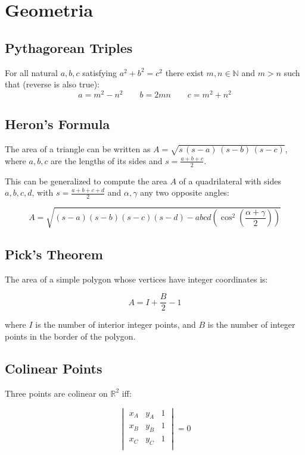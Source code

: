 \section{Geometria}
    
\subsection{Pythagorean Triples}

For all natural $a, b, c$ satisfying $a^2 + b^2 = c^2$ there exist $m, n \in \mathbb{N}$ and $m > n$ such that (reverse is also true):
$$a = m^2 - n^2 \qquad b = 2mn \qquad c = m^2 + n^2$$

\subsection{Heron's Formula}

The area of a triangle can be written as $A = \sqrt{s\,(s-a)\,(s-b)\,(s-c)}$, where $a, b, c$ are the lengths of its sides and $s = \frac{a+b+c}{2}$.

This can be generalized to compute the area $A$ of a quadrilateral with sides $a, b, c, d$, with $s = \frac{a+b+c+d}{2}$ and $\alpha, \gamma$ any two opposite angles:

$$ A = \sqrt{(s-a)(s-b)(s-c)(s-d) - abcd\left( \cos ^2 \left( \frac{\alpha+\gamma}{2} \right) \right)} $$

\subsection{Pick's Theorem}

The area of a simple polygon whose vertices have integer coordinates is:

\[
A = I + \frac{B}{2} - 1
\]

where $I$ is the number of interior integer points, and $B$ is the number of integer points in the border of the polygon.

\subsection{Colinear Points}

Three points are colinear on $\mathbb{R}^2$ iff:

$$ \begin{vmatrix}
x_A & y_A & 1 \\
x_B & y_B & 1 \\
x_C & y_C & 1 \\
\end{vmatrix}  = 0 $$

